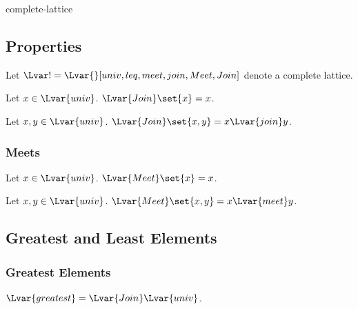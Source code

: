 \documentclass{stex}
\begin{document}
\begin{smodule}{complete-lattice}
  \subsection{Properties}

  \begin{forthel}
    Let $\Lvar! = \Lvar{}[univ,leq,meet,join,Meet,Join]$ denote a complete lattice.
  \end{forthel}
    
  \begin{forthel}
    \begin{proposition*}
      Let $x \in \Lvar{univ}$.
      ${\Lvar{Join}} \set{x} = x$.
    \end{proposition*}
    
    \begin{proposition*}
      Let $x, y \in \Lvar{univ}$.
      ${\Lvar{Join}} \set{x,y} = x {\Lvar{join}} y$.
    \end{proposition*}
  \end{forthel}

  \subsubsection{Meets}

  \begin{forthel}
    
    
    \begin{proposition*}
      Let $x \in \Lvar{univ}$.
      ${\Lvar{Meet}} \set{x} = x$.
    \end{proposition*}
    
    \begin{proposition*}
      Let $x, y \in \Lvar{univ}$.
      ${\Lvar{Meet}} \set{x,y} = x {\Lvar{meet}} y$.
    \end{proposition*}
  \end{forthel}

  \subsection{Greatest and Least Elements}

  \subsubsection{Greatest Elements}

  \begin{forthel}
    \begin{definition*}
      ${\Lvar{greatest}} = {\Lvar{Join}} \Lvar{univ}$.
    \end{definition*}


\end{forthel}
\end{smodule}
\end{document}
